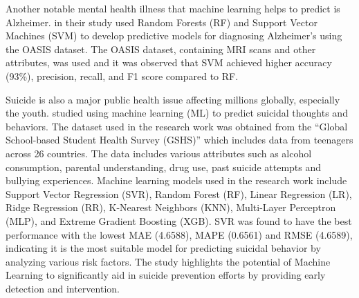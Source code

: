 Another notable mental health illness that machine learning helps to predict is Alzheimer. \citet{salunkhe2022prediction} in their study used Random Forests (RF) and Support Vector Machines (SVM) to develop predictive models for diagnosing Alzheimer's using the OASIS dataset. The OASIS dataset, containing MRI scans and other attributes, was used and it was observed that SVM achieved higher accuracy (93\%), precision, recall, and F1 score compared to RF. 


Suicide is also a major public health issue affecting millions globally, especially the youth. \citet{faisal2023machine} studied using machine learning (ML) to predict suicidal thoughts and behaviors. The dataset used in the research work was obtained from the “Global School-based Student Health Survey (GSHS)”  which includes data from teenagers across 26 countries. The data includes various attributes such as alcohol consumption, parental understanding, drug use, past suicide attempts and bullying experiences.  Machine learning models used in the research work include Support Vector Regression (SVR), Random Forest (RF), Linear Regression (LR), Ridge Regression (RR), K-Nearest Neighbors (KNN), Multi-Layer Perceptron (MLP), and Extreme Gradient Boosting (XGB). SVR was found to have the best performance with the lowest MAE (4.6588), MAPE (0.6561) and RMSE (4.6589), indicating it is the most suitable model for predicting suicidal behavior by analyzing various risk factors. The study highlights the potential of Machine Learning to significantly aid in suicide prevention efforts by providing early detection and intervention.

